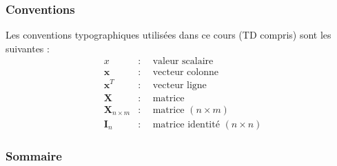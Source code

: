 \documentclass[french,svgnames,10pt]{beamer}
\begin{document}
\begin{frame}
 \frametitle{Conventions}
 Les conventions typographiques utilisées dans ce cours (TD compris) sont les suivantes :
 \begin{align*}
    & x                      & : & ~~\text{valeur scalaire}                 \\
    & \mathbf{x}             & : & ~~\text{vecteur colonne}                 \\
    & \mathbf{x}^T           & : & ~~\text{vecteur ligne}                   \\
    & \mathbf{X}             & : & ~~\text{matrice}                         \\
    & \mathbf{X}_{n\times m} & : & ~~\text{matrice $(n\times m)$}           \\
    & \mathbf{I}_{n}         & : & ~~\text{matrice identité $(n\times n)$}
 \end{align*}
\end{frame}

\begin{frame}
 \frametitle{Sommaire}
 \null
 \vspace{-1.8cm}
 \tableofcontents[hideallsubsections]
\end{frame}




\end{document}
